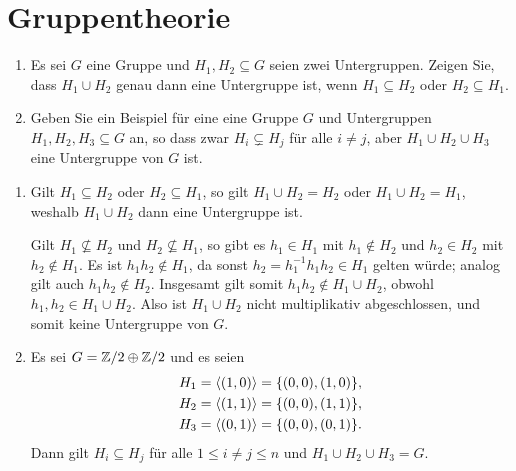 \section{Gruppentheorie}


\begin{question}
  \begin{enumerate}
    \item
      Es sei $G$ eine Gruppe und $H_1, H_2 \subseteq G$ seien zwei Untergruppen.
      Zeigen Sie, dass $H_1 \cup H_2$ genau dann eine Untergruppe ist, wenn $H_1 \subseteq H_2$ oder $H_2 \subseteq H_1$.
    \item
      Geben Sie ein Beispiel für eine eine Gruppe $G$ und Untergruppen $H_1, H_2, H_3 \subseteq G$ an, so dass zwar $H_i \subsetneq H_j$ für alle $i \neq j$, aber $H_1 \cup H_2 \cup H_3$ eine Untergruppe von $G$ ist.
  \end{enumerate}
\end{question}


\begin{solution}
  \begin{enumerate}
    \item
      Gilt $H_1 \subseteq H_2$ oder $H_2 \subseteq H_1$, so gilt $H_1 \cup H_2 = H_2$ oder $H_1 \cup H_2 = H_1$, weshalb $H_1 \cup H_2$ dann eine Untergruppe ist.
      
      Gilt $H_1 \nsubseteq H_2$ und $H_2 \nsubseteq H_1$, so gibt es $h_1 \in H_1$ mit $h_1 \notin H_2$ und $h_2 \in H_2$ mit $h_2 \notin H_1$.
      Es ist $h_1 h_2 \notin H_1$, da sonst $h_2 = h_1^{-1} h_1 h_2 \in H_1$ gelten würde;
      analog gilt auch $h_1 h_2 \notin H_2$.
      Insgesamt gilt somit $h_1 h_2 \notin H_1 \cup H_2$, obwohl $h_1, h_2 \in H_1 \cup H_2$.
      Also ist $H_1 \cup H_2$ nicht multiplikativ abgeschlossen, und somit keine Untergruppe von $G$.
    \item
      Es sei $G = \mathbb{Z}/2 \oplus \mathbb{Z}/2$ und es seien
      \begin{align*}
        H_1 &= \left\langle  (1,0)  \right\rangle = \{ (0,0), (1,0) \},
        \\
        H_2 &= \left\langle  (1,1)  \right\rangle = \{ (0,0), (1,1) \},
        \\
        H_3 &= \left\langle  (0,1)  \right\rangle = \{ (0,0), (0,1) \}.
      \end{align*}
      Dann gilt $H_i \subseteq H_j$ für alle $1 \leq i \neq j \leq n$ und $H_1 \cup H_2 \cup H_3 = G$.
  \end{enumerate}
\end{solution}


